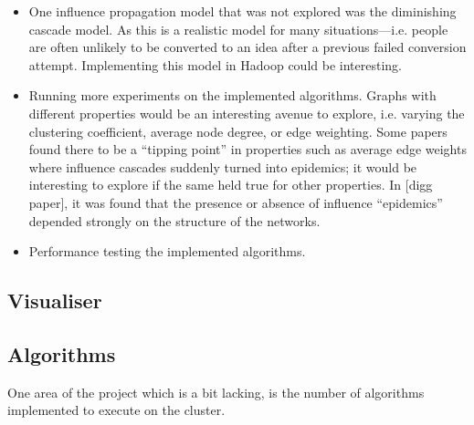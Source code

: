 \begin{itemize}
	\item One influence propagation model that was not explored was the diminishing cascade model. As this is a realistic model for many situations---i.e. people are often unlikely to be converted to an idea after a previous failed conversion attempt. Implementing this model in Hadoop could be interesting.
	\item Running more experiments on the implemented algorithms. Graphs with different properties would be an interesting avenue to explore, i.e. varying the clustering coefficient, average node degree, or edge weighting. Some papers found there to be a ``tipping point'' in properties such as average edge weights where influence cascades suddenly turned into epidemics; it would be interesting to explore if the same held true for other properties. In [digg paper], it was found that the presence or absence of influence ``epidemics'' depended strongly on the structure of the networks.
	\item Performance testing the implemented algorithms.
\end{itemize}

\subsection{Visualiser}

\subsection{Algorithms}
One area of the project which is a bit lacking, is the number of algorithms implemented to execute on the cluster. 
